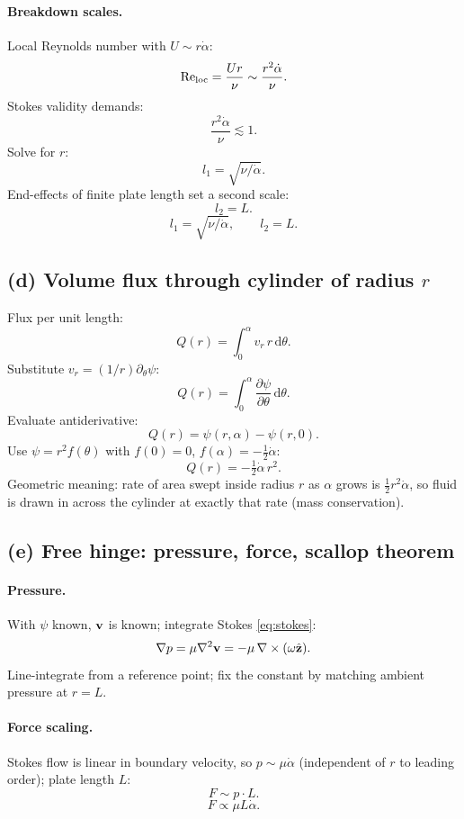 \documentclass[11pt]{article}
\newcommand{\de}{\mathrm{d}}
\newcommand{\pd}[2]{\frac{\partial #1}{\partial #2}}
\newcommand{\Lap}{\nabla^{2}}
\newcommand{\zhat}{\hat{\mathbf{z}}}
\begin{document}
\paragraph{Breakdown scales.} Local Reynolds number with $U\sim r\dot\alpha$:
\[ \mathrm{Re}_{\rm loc} = \frac{Ur}{\nu} \sim \frac{r^{2}\dot\alpha}{\nu}. \]
Stokes validity demands:
\[ \frac{r^{2}\dot\alpha}{\nu} \lesssim 1. \]
Solve for $r$:
\[ l_1 = \sqrt{\nu/\dot\alpha}. \]
End-effects of finite plate length set a second scale:
\[ l_2 = L. \]
\[ \boxed{\;l_1=\sqrt{\nu/\dot\alpha},\qquad l_2 = L.\;} \]

\subsection*{(d) Volume flux through cylinder of radius $r$}

Flux per unit length:
\[ Q(r) = \int_{0}^{\alpha} v_r\,r\,\de\theta. \]
Substitute $v_r = (1/r)\partial_\theta\psi$:
\[ Q(r) = \int_{0}^{\alpha}\pd{\psi}{\theta}\,\de\theta. \]
Evaluate antiderivative:
\[ Q(r) = \psi(r,\alpha)-\psi(r,0). \]
Use $\psi = r^{2}f(\theta)$ with $f(0)=0$, $f(\alpha)=-\tfrac12\dot\alpha$:
\begin{equation}
\boxed{\;Q(r) = -\tfrac12\dot\alpha\,r^{2}.\;}
\label{eq:Q}
\end{equation}
Geometric meaning: rate of area swept inside radius $r$ as $\alpha$ grows is $\tfrac12 r^{2}\dot\alpha$, so fluid is drawn in across the cylinder at exactly that rate (mass conservation).

\subsection*{(e) Free hinge: pressure, force, scallop theorem}

\paragraph{Pressure.} With $\psi$ known, $\vb v$ is known; integrate Stokes \eqref{eq:stokes}:
\[ \nabla p = \mu\Lap\vb v = -\mu\,\nabla\times(\omega\zhat). \]
Line-integrate from a reference point; fix the constant by matching ambient pressure at $r=L$.

\paragraph{Force scaling.} Stokes flow is linear in boundary velocity, so $p\sim\mu\dot\alpha$ (independent of $r$ to leading order); plate length $L$:
\[ F\sim p\cdot L. \]
\[ \boxed{\;F\propto \mu L\dot\alpha.\;} \]
\end{document}
